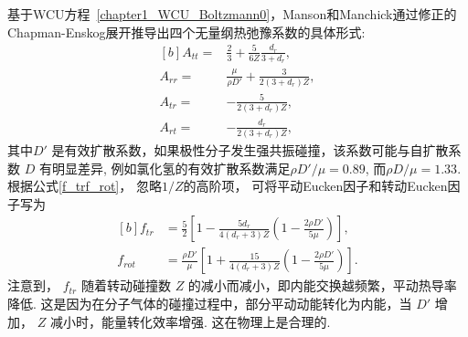 






基于WCU方程~\eqref{chapter1_WCU_Boltzmann0}，Manson和Manchick通过修正的Chapman-Enskog展开推导出四个无量纲热弛豫系数的具体形式:
\begin{equation}\label{Mason_rates}
\begin{aligned}[b]
A_{tt}=&\frac{2}{3}+\frac{5}{6Z}\frac{d_r}{3+d_r}, \\
A_{rr}=&\frac{\mu}{\rho{D'}}+\frac{3}{2(3+d_r)Z}, \\
A_{tr}=&-\frac{5}{2(3+d_r)Z},\\
A_{rt}=&-\frac{d_r}{2(3+d_r)Z},
\end{aligned}
\end{equation}
其中$D'$ 是有效扩散系数，如果极性分子发生强共振碰撞，该系数可能与自扩散系数 $D$ 有明显差异, 例如氯化氢的有效扩散系数满足$\rho{D}'/\mu=0.89$, 而$\rho{D}/\mu=1.33$. 根据公式\eqref{f_trf_rot}， 忽略$ 1/Z $的高阶项，
可将平动Eucken因子和转动Eucken因子写为~\cite{mason1962heat}
\begin{equation}\label{Eucken}
\begin{aligned}[b]
f_{tr}&=\frac{5}{2}\left[1-\frac{5d_r}{4(d_r+3)Z}\left(1-\frac{2\rho{D'}}{5\mu}\right)\right], \\
f_{rot}&=\frac{\rho{D'}}{\mu}\left[ 1+\frac{15}{4(d_r+3)Z}\left(1-\frac{2\rho{D'}}{5\mu}\right)
\right].
\end{aligned}
\end{equation}
注意到， $f_{tr}$ 随着转动碰撞数 $Z$ 的减小而减小，即内能交换越频繁，平动热导率降低. 这是因为在分子气体的碰撞过程中，部分平动动能转化为内能，当 $D'$ 增加， $Z$ 减小时，能量转化效率增强. 这在物理上是合理的.

